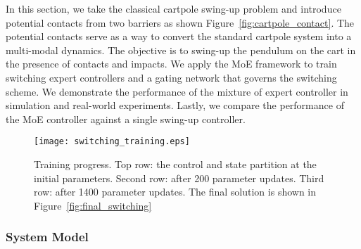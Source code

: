 In this section, we take the classical cartpole swing-up problem and introduce
potential contacts from two barriers as shown Figure~\ref{fig:cartpole_contact}. 
%
The potential contacts serve as a way to convert the standard cartpole system
into a multi-modal dynamics.
%
The objective is to swing-up the pendulum on the cart in the presence of
contacts and impacts.
%
We apply the MoE framework to train switching expert controllers and a gating
network that governs the switching scheme.
%
We demonstrate the performance of the mixture of expert controller in
simulation and real-world experiments.
%
Lastly, we compare the performance of the MoE controller against
a single swing-up controller. 
\begin{figure}[H]
    \centering
    \texttt{[image: switching\_training.eps]}
    \caption{Training progress. Top row: the control and state partition at the
    initial parameters. Second row: after 200 parameter updates. Third row:
    after 1400 parameter updates. The final solution is shown in
    Figure~\ref{fig:final_switching}}
    \label{fig:switching_training}
\end{figure} 

\subsubsection{System Model}
\label{sssec:cartpole_model}


